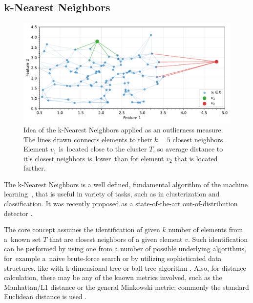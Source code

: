 \subsection{k-Nearest Neighbors}
\label{section:kNN}

\begin{figure}[t]
    \centering
    \includegraphics[width=\textwidth]{images/measures/knn-distance.pdf}
    \caption{Idea of the k-Nearest Neighbors applied as an outlierness measure. \\
             The lines drawn connects elements to their $k=5$ closest neighbors.
             Element $v_1$ is~located close to the cluster $T$, so average distance
             to it's closest neighbors is~lower~than for element $v_2$ that is located farther.}
    \label{fig:knn-idea}
\end{figure}

The k-Nearest Neighbors is a well defined, fundamental algorithm of the machine learning~\cite{Hastie-2009}, that is useful in variety of tasks, such as in clusterization and classification. It was recently proposed as a state-of-the-art out-of-distribution detector \cite{Sun-2022}.

The core concept assumes the identification of given $k$ number of elements from a~known set $T$ that are closest neighbors of a given element $v$. Such identification can be performed by using one from a number of possible underlying algorithms, for~example a~naive brute-force search or by utilizing sophisticated data structures, like with k-dimensional tree \cite{Bentley-1975}\cite{Brown-2015} or ball tree algorithm \cite{Omohundro-1989}\cite{Liu-2006}. Also, for distance calculation, there may be any of the known metrics involved, such as the Manhattan/L1 distance or the general Minkowski metric; commonly the standard Euclidean distance is used \cite{Singh-2013}.


